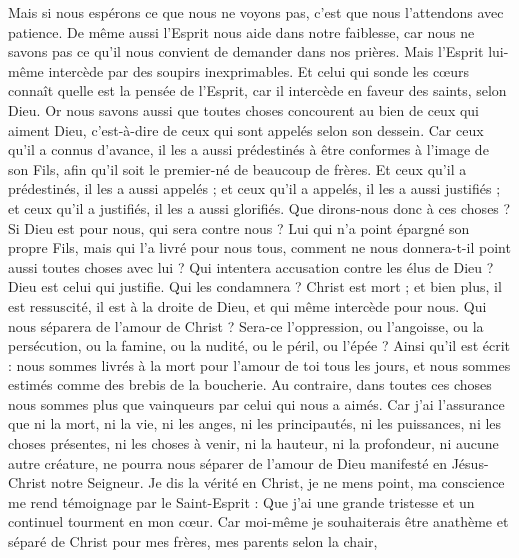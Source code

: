\begin{multicols}{2}
Mais si nous espérons ce que nous ne voyons pas, c'est que nous l'attendons avec patience.
De même aussi l’Esprit nous aide dans notre faiblesse, car nous ne savons pas ce qu’il nous convient de demander dans nos prières. Mais l’Esprit lui-même intercède par des soupirs inexprimables.
Et celui qui sonde les cœurs connaît quelle est la pensée de l'Esprit, car il intercède en faveur des saints, selon Dieu.
Or nous savons aussi que toutes choses concourent au bien de ceux qui aiment Dieu, c'est-à-dire de ceux qui sont appelés selon son dessein.
Car ceux qu'il a connus d’avance, il les a aussi prédestinés à être conformes à l'image de son Fils, afin qu'il soit le premier-né de beaucoup de frères.
Et ceux qu'il a prédestinés, il les a aussi appelés ; et ceux qu'il a appelés, il les a aussi justifiés ; et ceux qu'il a justifiés, il les a aussi glorifiés.
Que dirons-nous donc à ces choses ? Si Dieu est pour nous, qui sera contre nous ?
Lui qui n'a point épargné son propre Fils, mais qui l'a livré pour nous tous, comment ne nous donnera-t-il point aussi toutes choses avec lui ?
Qui intentera accusation contre les élus de Dieu ? Dieu est celui qui justifie.
Qui les condamnera ? Christ est mort ; et bien plus, il est ressuscité, il est à la droite de Dieu, et qui même intercède pour nous.
Qui nous séparera de l'amour de Christ ? Sera-ce l'oppression, ou l'angoisse, ou la persécution, ou la famine, ou la nudité, ou le péril, ou l'épée ?
Ainsi qu’il est écrit : nous sommes livrés à la mort pour l’amour de toi tous les jours, et nous sommes estimés comme des brebis de la boucherie.
Au contraire, dans toutes ces choses nous sommes plus que vainqueurs par celui qui nous a aimés.
Car j’ai l’assurance que ni la mort, ni la vie, ni les anges, ni les principautés, ni les puissances, ni les choses présentes, ni les choses à venir,
ni la hauteur, ni la profondeur, ni aucune autre créature, ne pourra nous séparer de l'amour de Dieu manifesté en Jésus-Christ notre Seigneur.
\VerseOne{}Je dis la vérité en Christ, je ne mens point, ma conscience me rend témoignage par le Saint-Esprit :
Que j’ai une grande tristesse et un continuel tourment en mon cœur.
Car moi-même je souhaiterais être anathème et séparé de Christ pour mes frères, mes parents selon la chair,

\end{multicols}
